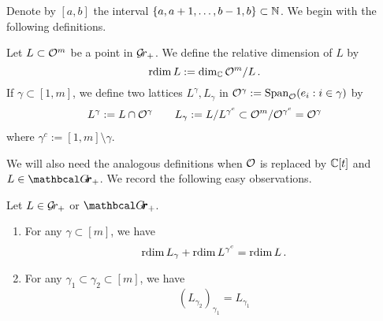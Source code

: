 \documentclass[draft]{article} %
\begin{document}
Denote by $[a,b]$ the interval $\{a,a+1,\dots,b-1,b\}\subset\mathbb N$. 
% 
We begin with the following definitions.
\begin{definition}
Let $ L \subset \mathcal O^m$ be a point in $ \mathcal{G}\!r_+$.  We define the relative dimension of $L $ by
$$
\operatorname{rdim} L := \dim_\mathbb C \mathcal O^m/L\,. 
$$
% 
If $ \gamma \subset [1,m]$, we define two lattices $ L^\gamma, L_\gamma $ in $ \mathcal O^\gamma := \operatorname{Span}_{\mathcal O}(e_i : i \in \gamma) $ by
\begin{gather*}
L^\gamma:= L \cap \mathcal O^\gamma  \qquad L_\gamma := L / L^{\gamma^c} \subset \mathcal O^m / \mathcal O^{\gamma^c} = \mathcal O^\gamma
\end{gather*}
where $ \gamma^c := [1,m] \setminus \gamma$.
% 
\end{definition}
We will also need the analogous definitions when $ \mathcal O$ is replaced by $ \mathbb C[t]$ and $L \in \Grth_+$. 
% 
We record the following easy observations.
\begin{lemma} \label{le:rdimTrans} Let $ L \in \mathcal{G}\!r_+$ or $\Grth_+$.
\begin{enumerate}
    \item For any $ 
    \gamma \subset [m] $, we have 
    $$ \operatorname{rdim} L_\gamma + \operatorname{rdim} L^{\gamma^c} = \operatorname{rdim} L \,.$$
    \item For any $ \gamma_1 \subset \gamma_2 \subset [m]$, we have $$ (L_{\gamma_2})_{\gamma_1} = L_{\gamma_1}
$$
\end{enumerate}
\end{lemma}
\end{document}
